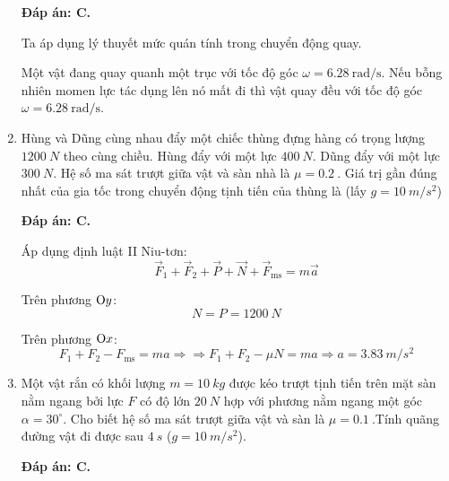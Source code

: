 \begin{enumerate}[label=\bfseries Câu \arabic*:]
	\loigiai
	{	\textbf{Đáp án: C.}
		
	Ta áp dụng lý thuyết mức quán tính trong chuyển động quay. 
	
	Một vật đang quay quanh một trục với tốc độ góc $\omega = \SI{6,28}{\radian/\second}$. Nếu bỗng nhiên momen lực tác dụng lên nó mất đi thì vật quay đều với tốc độ góc $\omega =\SI{ 6,28}{\radian/\second}$.
	}
	\item {}
	
	\cauhoi
	{Hùng và Dũng cùng nhau đẩy một chiếc thùng đựng hàng có trọng lượng $\SI{1200}{N}$ theo cùng chiều. Hùng đẩy với một lực $\SI{400}{N}$. Dũng đẩy với một lực $\SI{300}{N}$. Hệ số ma sát trượt giữa vật và sàn nhà là $\mu = \SI{0.2}{}$. Giá trị gần đúng nhất của gia tốc trong chuyển động tịnh tiến của thùng là (lấy $g=\SI{10}{m/s^2}$)
	}
	
	\loigiai
	{	\textbf{Đáp án: C.}
		
	Áp dụng định luật II Niu-tơn:
	$$\vec F_1 + \vec F_2 + \vec P + \vec N + \vec F_\text{ms} = m \vec a$$
	
	Trên phương $\text Oy$:
	$$N=P = \SI{1200}{N}$$
	
	Trên phương $\text Ox$:
	$$F_1 + F_2 - F_\text{ms} = ma \Rightarrow \Rightarrow F_1 + F_2 - \mu N = ma \Rightarrow a = \SI{3.83}{m/s^2}$$
	}
	\item {}
	
	\cauhoi
	{Một vật rắn có khối lượng $m=\SI{10}{kg}$ được kéo trượt tịnh tiến trên mặt sàn nằm ngang bởi lực $F$ có độ lớn $\SI{20}{N}$ hợp với phương nằm ngang một góc $\alpha = 30^\circ$. Cho biết hệ số ma sát trượt giữa vật và sàn là $\mu = \SI{0.1}{}$.Tính quãng đường vật đi được sau $\SI{4}{s}$ ($g=\SI{10}{m/s^2}$).
	}
	
	\loigiai
	{	\textbf{Đáp án: C.}
	
}
\end{enumerate}
